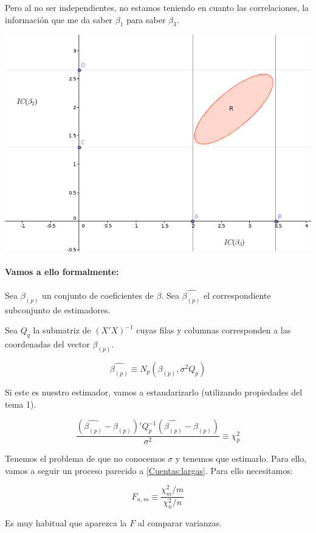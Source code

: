  Pero al no ser independientes, no estamos teniendo en cuanto las correlaciones, la información que me da saber $β_1$ para saber $β_3$. 

\begin{center}
\includegraphics[scale=0.5]{img/confianzamultivariantebien.png}
\end{center}

\paragraph{Vamos a ello formalmente:}
\newcommand{\bpp}{β_{(p)}}
\newcommand{\hbpp}{\hat{β_{(p)}}}
\newcommand{\fpnk}{F_{p,n-k-1}}
Sea $β_{(p)}$ un conjunto de coeficientes de $β$. Sea $\hbpp$ el correspondiente subconjunto de estimadores.

Sea $Q_q$ la submatriz de $(X'X)^{-1}$ cuyas filas y columnas corresponden a las coordenadas del vector $\bpp$.

\[\hbpp \equiv N_p \left( \bpp, σ^2Q_p \right)\]

Si este es nuestro estimador, vamos a estandarizarlo (utilizando propiedades del tema 1).

\[
\frac{(\hbpp - \bpp)'Q_p^{-1}(\hbpp - \bpp)}{σ^2}\equiv \chi^2_p
\]

Tenemos el problema de que no conocemos $σ$ y tenemos que estimarlo. Para ello, vamos a seguir un proceso parecido a \ref{Cuentas:largas}. Para ello necesitamos:

\begin{defn}[Distribución $F_{n,m}$]

\[
F_{n,m} \equiv \frac{\chi^2_m / m}{\chi^2_n / n}
\]

Es muy habitual que aparezca la $F$ al comparar varianzas. 
\end{defn}

